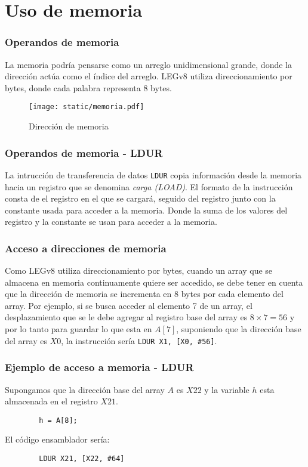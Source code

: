 \documentclass[aspectradio=43]{beamer}
\begin{document}
\section{Uso de memoria}
\begin{frame}
    \frametitle{Operandos de memoria}
    La memoria podría pensarse como un arreglo unidimensional grande, donde la dirección actúa como el índice del arreglo. LEGv8 utiliza direccionamiento por bytes, donde cada palabra representa 8 bytes.\\
    \begin{figure}
        \centering
        \texttt{[image: static/memoria.pdf]}
        \caption{Dirección de memoria}
    \end{figure}
\end{frame}

\begin{frame}
    \frametitle{Operandos de memoria - LDUR}
    La intrucción de transferencia de datos \texttt{LDUR} copia información desde la memoria hacia un registro que se denomina \textit{carga (LOAD)}. El formato de la instrucción consta de el registro en el que se cargará, seguido del registro junto con la constante usada para acceder a la memoria. Donde la suma de los valores del registro y la constante se usan para acceder a la memoria.\\
\end{frame}

\begin{frame}
    \frametitle{Acceso a direcciones de memoria}
    Como LEGv8 utiliza direccionamiento por bytes, cuando un array que se almacena en memoria continuamente quiere ser accedido, se debe tener en cuenta que la dirección de memoria se incrementa en 8 bytes por cada elemento del array. Por ejemplo, si se busca acceder al elemento 7 de un array, el desplazamiento que se le debe agregar al registro base del array es \(8 \times 7 = 56 \) y por lo tanto para guardar lo que esta en $A[7]$, suponiendo que la dirección base del array es \(X0\), la instrucción sería \texttt{LDUR X1, [X0, \#56]}.
\end{frame}

\begin{frame}[containsverbatim]
    \frametitle{Ejemplo de acceso a memoria - LDUR}
    Supongamos que la dirección base del array $A$ es \(X22\) y la variable $h$ esta almacenada en el registro \(X21\).\\
    \begin{verbatim}
        h = A[8];
    \end{verbatim}
    El código ensamblador sería:
    \begin{verbatim}
        LDUR X21, [X22, #64]
    \end{verbatim} 
\end{frame}
\end{document}
